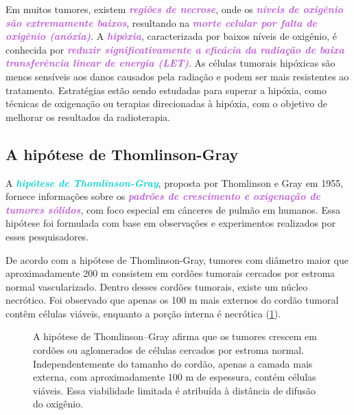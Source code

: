 \documentclass[11pt,a4paper]{article}
\begin{document}
	Em muitos tumores, existem \textcolor{MediumOrchid}{\textbf{\textit{regiões de necrose}}}, onde os \textcolor{MediumOrchid}{\textbf{\textit{níveis de oxigênio são extremamente baixos}}}, resultando na \textcolor{MediumOrchid}{\textbf{\textit{morte celular por falta de oxigênio (anóxia)}}}. A \textcolor{MediumOrchid}{\textbf{\textit{hipóxia}}}, caracterizada por baixos níveis de oxigênio, é conhecida por \textcolor{MediumOrchid}{\textbf{\textit{reduzir significativamente a eficácia da radiação de baixa transferência linear de energia (LET)}}}. As células tumorais hipóxicas são menos sensíveis aos danos causados pela radiação e podem ser mais resistentes ao tratamento. Estratégias estão sendo estudadas para superar a hipóxia, como técnicas de oxigenação ou terapias direcionadas à hipóxia, com o objetivo de melhorar os resultados da radioterapia.

\subsection*{A hipótese de Thomlinson-Gray}

	A \textcolor{DarkTurquoise}{\textbf{\textit{hipótese de Thomlinson-Gray}}}, proposta por Thomlinson e Gray em 1955, fornece informações  sobre os \textcolor{MediumOrchid}{\textbf{\textit{padrões de crescimento e oxigenação de tumores sólidos}}}, com foco especial em cânceres de pulmão em humanos. Essa hipótese foi formulada com base em observações e experimentos realizados por esses pesquisadores.

	De acordo com a hipótese de Thomlinson-Gray, tumores com diâmetro maior que aproximadamente 200 \mu m consistem em cordões tumorais cercados por estroma normal vascularizado. Dentro desses cordões tumorais, existe um núcleo necrótico. Foi observado que apenas os 100 \mu m mais externos do cordão tumoral contêm células viáveis, enquanto a porção interna é necrótica (\ref{fig:hipoteseThomlinsonGray}).

	\begin{figure}[h]
		\centering
		\caption{A hipótese de Thomlinson–Gray afirma que os tumores crescem em cordões ou aglomerados de células cercados por estroma normal. Independentemente do tamanho do cordão, apenas a camada mais externa, com aproximadamente 100 \mu m de espessura, contém células viáveis. Essa viabilidade limitada é atribuída à distância de difusão do oxigênio.}
		\label{fig:hipoteseThomlinsonGray}
	\end{figure}
\end{document}

